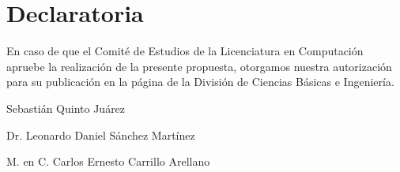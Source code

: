 \thispagestyle{empty}
\section*{\centering Declaratoria}
\noindent En caso de que el Comité de Estudios de la Licenciatura en Computación apruebe la realización de la presente propuesta, otorgamos nuestra autorización para su publicación en la página de la División de Ciencias Básicas e Ingeniería.\\[2cm]

\begin{center}
  Sebastián Quinto Juárez\\[4cm]%
  \begin{minipage}{0.4\textwidth}
    \centering
    Dr. Leonardo Daniel Sánchez Martínez%
    

  \end{minipage}
    \begin{minipage}{0.4\textwidth}
    \centering
M. en C. Carlos Ernesto Carrillo Arellano%
    
  \end{minipage}
\end{center}
\newpage
